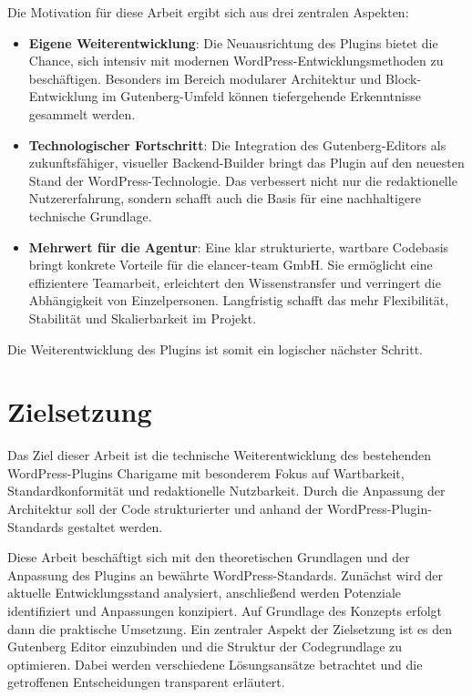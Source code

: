 Die Motivation für diese Arbeit ergibt sich aus drei zentralen Aspekten:
\begin{itemize}
    \item \textbf{Eigene Weiterentwicklung}: Die Neuausrichtung des Plugins bietet die Chance, sich intensiv mit modernen WordPress-Entwicklungsmethoden zu beschäftigen.
    Besonders im Bereich modularer Architektur und Block-Entwicklung im Gutenberg-Umfeld können tiefergehende Erkenntnisse gesammelt werden.

    \item \textbf{Technologischer Fortschritt}: Die Integration des Gutenberg-Editors als zukunftsfähiger, visueller Backend-Builder bringt das Plugin auf den neuesten Stand der WordPress-Technologie. Das verbessert nicht nur die redaktionelle Nutzererfahrung, sondern schafft auch die Basis für eine nachhaltigere technische Grundlage.

    \item \textbf{Mehrwert für die Agentur}: Eine klar strukturierte, wartbare Codebasis bringt konkrete Vorteile für die elancer-team GmbH. Sie ermöglicht eine effizientere Teamarbeit, erleichtert den Wissenstransfer und verringert die Abhängigkeit von Einzelpersonen. Langfristig schafft das mehr Flexibilität, Stabilität und Skalierbarkeit im Projekt.
\end{itemize}
Die Weiterentwicklung des Plugins ist somit ein logischer nächster Schritt.


\section{Zielsetzung}

Das Ziel dieser Arbeit ist die technische Weiterentwicklung des bestehenden WordPress-Plugins Charigame mit besonderem Fokus auf Wartbarkeit, Standardkonformität und redaktionelle Nutzbarkeit.
Durch die Anpassung der Architektur soll der Code strukturierter und anhand der WordPress-Plugin-Standards gestaltet werden.

Diese Arbeit beschäftigt sich mit den theoretischen Grundlagen und der Anpassung des Plugins an bewährte WordPress-Standards.
Zunächst wird der aktuelle Entwicklungsstand analysiert, anschließend werden Potenziale identifiziert und Anpassungen konzipiert.
Auf Grundlage des Konzepts erfolgt dann die praktische Umsetzung.
Ein zentraler Aspekt der Zielsetzung ist es den Gutenberg Editor einzubinden und die Struktur der Codegrundlage zu optimieren.
Dabei werden verschiedene Lösungsansätze betrachtet und die getroffenen Entscheidungen transparent erläutert.

